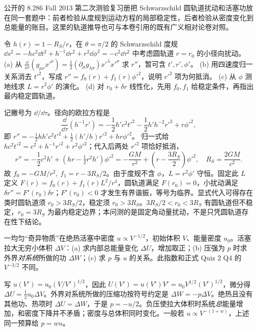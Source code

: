 公开的 8.286 Fall 2013 第二次测验复习册把 Schwarzschild 圆轨道扰动和活塞功放在同一套题中：前者检验从度规到运动方程的局部稳定性，后者检验从密度变化到总能量的账目。这里的轨道推导也可与本卷引用的既有广义相对论卷对照。

\begin{exercise}
令 $h(r)=1-R_S/r$，在 $\theta=\pi/2$ 的 Schwarzschild 度规
$\dd s^2=-hc^2\dd t^2+h^{-1}\dd r^2+r^2\dd\phi^2=-c^2\dd\tau^2$ 中考虑圆轨道 $r=r_0$ 的小径向扰动。
(a) 从 $\frac{\dd}{\dd\tau}(g_{\mu\nu}x'^\nu)=\frac12(\partial_\mu g_{\lambda\sigma})x'^\lambda x'^\sigma$ 求 $r''$，暂可含 $t',r',\phi'$。
(b) 用四速度归一关系消去 $t'^2$，写成 $r''=f_0(r)+f_1(r)\phi'^2$，说明 $r'^2$ 项为何抵消。
(c) 从 $\phi$ 测地线求 $L=r^2\phi'$ 的演化。
(d) 对 $r_0+\delta r$ 线性化，先用 $f_0,f_1$ 给稳定条件，再指出最内稳定圆轨道。
\end{exercise}
\begin{solution}
记撇号为 $\dd/\dd\tau$。径向的欧拉方程是
\[
\frac{\dd}{\dd\tau}(h^{-1}r')
=-\frac12h'c^2t'^2-\frac12h'h^{-2}r'^2+r\phi'^2,
\]
即 $r''=-\frac12hh'c^2t'^2+\frac12(h'/h)r'^2+hr\phi'^2$。
归一式给 $hc^2t'^2=c^2+h^{-1}r'^2+r^2\phi'^2$；代入后两处 $r'^2$ 项恰好抵消，
\[
r''=-\frac12c^2h'+(hr-\tfrac12r^2h')\phi'^2
=-\frac{GM}{r^2}+
\left(r-\frac{3R_S}{2}\right)\phi'^2 ,
\quad R_S=\frac{2GM}{c^2}.
\]
故 $f_0=-GM/r^2,\ f_1=r-3R_S/2$。由于度规不含 $\phi$，$L=r^2\phi'$ 守恒。固定此 $L$ 定义
$F(r)=f_0(r)+f_1(r)L^2/r^4$，圆轨道满足 $F(r_0)=0$，小扰动满足
$\delta r''=F'(r_0)\delta r$；$F'(r_0)<0$ 才发生有界谐振，等号为临界。显式代入可得存在类时圆轨道须 $r_0>3R_S/2$，稳定须 $r_0>3R_S$。$3R_S/2<r_0<3R_S$ 有圆轨道但不稳定，$r_0=3R_S$ 为最内稳定边界；本问测的是固定角动量扰动，不是只凭圆轨道存在性下结论。
\end{solution}

\begin{exercise}
一均匀“奇异物质”在绝热活塞中密度 $u\propto V^{-1/2}$，初始体积 $V$、能量密度 $u_0$。活塞拉大无穷小体积 $\Delta V$：(a) 求内部总能量变化 $\Delta U$，增加取正；(b) 压强为 $p$ 时求外界\emph{对系统}所做的功 $\Delta W$；(c) 求 $p$ 与 $u$ 的关系。此指数和正式 Quiz 2 Q4 的 $V^{-3/2}$ 不同。
\end{exercise}
\begin{solution}
写 $u(V')=u_0(V/V')^{1/2}$，因此 $U(V')=u(V')V'=u_0V^{1/2}(V')^{1/2}$，微分得
$\Delta U=\tfrac12u_0\Delta V$。外界对系统所做的压缩功按符号约定是 $\Delta W=-p\Delta V$。绝热且没有其他功、热项时 $\Delta U=\Delta W$，于是 $p=-u/2$。负压使拉大体积时系统\emph{总}能量增加，和密度下降并不矛盾；密度与总体积同时变化。一般若 $u\propto V^{-(1+w)}$，上述同一预算给 $p=wu$。
\end{solution}
